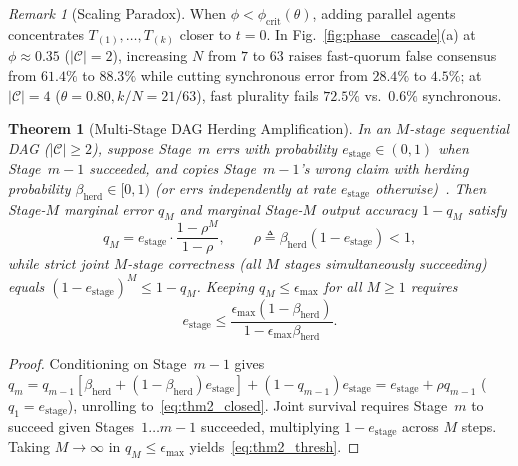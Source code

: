 \documentclass[conference]{IEEEtran}
\newtheorem{theorem}{Theorem}
\theoremstyle{definition}
\theoremstyle{remark}
\newtheorem{remark}{Remark}
\newcommand{\phicrit}{\phi_{\mathrm{crit}}}
\newcommand{\betaherd}{\beta_{\mathrm{herd}}}
\begin{document}
\begin{remark}[Scaling Paradox]
When $\phi < \phicrit(\theta)$, adding parallel agents concentrates $T_{(1)}, \dots, T_{(k)}$ closer to $t = 0$. In Fig.~\ref{fig:phase_cascade}(a) at $\phi \approx 0.35$ ($|\mathcal{C}| = 2$), increasing $N$ from $7$ to $63$ raises fast-quorum false consensus from $61.4\%$ to $88.3\%$ while cutting synchronous error from $28.4\%$ to $4.5\%$; at $|\mathcal{C}| = 4$ ($\theta = 0.80, k/N = 21/63$), fast plurality fails $72.5\%$ vs.\ $0.6\%$ synchronous.
\end{remark}

\begin{theorem}[Multi-Stage DAG Herding Amplification]\label{thm:cascade}
In an $M$-stage sequential DAG ($|\mathcal{C}| \ge 2$), suppose Stage~$m$ errs with probability $e_{\mathrm{stage}} \in (0, 1)$ when Stage~$m-1$ succeeded, and copies Stage~$m-1$'s wrong claim with herding probability $\betaherd \in [0, 1)$ (or errs independently at rate $e_{\mathrm{stage}}$ otherwise)~\cite{herding2026cascades}. Then Stage-$M$ marginal error $q_M$ and marginal Stage-$M$ output accuracy $1 - q_M$ satisfy
\begin{equation}\label{eq:thm2_closed}
  q_M = e_{\mathrm{stage}} \cdot \frac{1 - \rho^M}{1 - \rho}, \qquad \rho \triangleq \betaherd(1 - e_{\mathrm{stage}}) < 1,
\end{equation}
while strict joint $M$-stage correctness (all $M$ stages simultaneously succeeding) equals $(1 - e_{\mathrm{stage}})^M \le 1 - q_M$. Keeping $q_M \le \epsilon_{\max}$ for all $M \ge 1$ requires
\begin{equation}\label{eq:thm2_thresh}
  e_{\mathrm{stage}} \le \frac{\epsilon_{\max}(1 - \betaherd)}{1 - \epsilon_{\max}\betaherd}.
\end{equation}
\end{theorem}

\begin{proof}
Conditioning on Stage~$m-1$ gives $q_m = q_{m-1}[\betaherd + (1 - \betaherd)e_{\mathrm{stage}}] + (1 - q_{m-1})e_{\mathrm{stage}} = e_{\mathrm{stage}} + \rho q_{m-1}$ ($q_1 = e_{\mathrm{stage}}$), unrolling to~\eqref{eq:thm2_closed}. Joint survival requires Stage~$m$ to succeed given Stages~$1 \dots m-1$ succeeded, multiplying $1 - e_{\mathrm{stage}}$ across $M$ steps. Taking $M \to \infty$ in $q_M \le \epsilon_{\max}$ yields~\eqref{eq:thm2_thresh}.
\end{proof}
\end{document}
